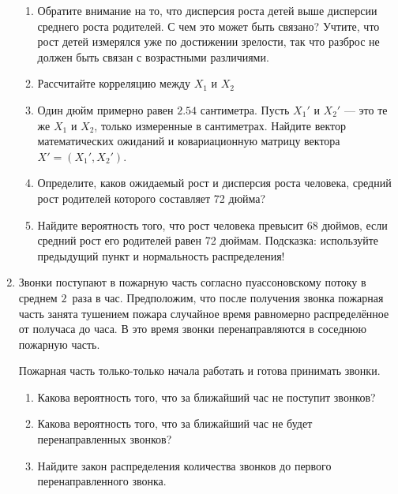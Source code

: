 \documentclass[12pt, a4paper]{article}\usepackage[]{graphicx}\usepackage[]{color}
\begin{document}
\begin{enumerate}
					\begin{enumerate}
						\item Обратите внимание на то, что дисперсия роста детей выше дисперсии среднего роста
						родителей. С чем это
						может быть связано? Учтите, что рост детей измерялся уже по достижении
						зрелости, так что разброс не должен быть связан с возрастными различиями.
						\item Рассчитайте корреляцию между $X_1$ и $X_2$
						\item Один дюйм примерно равен $2.54$ сантиметра. Пусть $X_1'$ и $X_2'$ — это те же $X_1$ и $X_2$, только измеренные в сантиметрах. Найдите вектор математических ожиданий и ковариационную матрицу вектора $X'=(X_1', X_2')$.
						\item Определите, каков ожидаемый рост и дисперсия роста человека, средний рост родителей которого составляет 72 дюйма?
						\item Найдите вероятность того, что рост человека превысит 68 дюймов, если средний рост его родителей равен 72 дюймам. Подсказка: используйте предыдущий пункт и нормальность распределения!
					\end{enumerate}


					\item Звонки поступают в пожарную часть согласно пуассоновскому потоку в среднем $2$~раза в час. Предположим, что после получения звонка пожарная часть занята тушением пожара случайное время равномерно распределённое от получаса до часа. В это время звонки перенаправляются в соседнюю пожарную часть.

					Пожарная часть только-только начала работать и готова принимать звонки.
					\begin{enumerate}
						\item Какова вероятность того, что за ближайший час не поступит звонков?
						\item Какова вероятность того, что за ближайший час не будет перенаправленных звонков?
						\item Найдите закон распределения количества звонков до первого перенаправленного звонка.
					\end{enumerate}


\end{enumerate}
\end{document}
